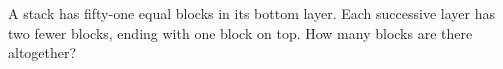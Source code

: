 A stack has fifty-one equal blocks in its bottom layer. Each successive layer has two fewer blocks, ending with one block on top. How many blocks are there altogether?
